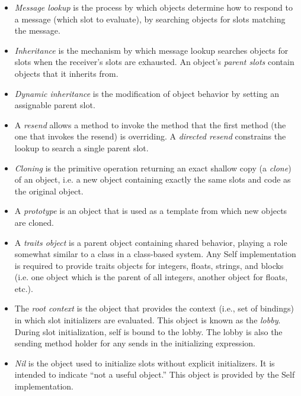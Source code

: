 \documentclass[letterpaper,10pt,english]{sphinxmanual}
\begin{document}
\begin{itemize}
\item {} 
\emph{Message lookup} is the process by which objects determine how to respond to a message (which slot to evaluate), by searching objects for slots matching the message.

\item {} 
\emph{Inheritance} is the mechanism by which message lookup searches objects for slots when the receiver’s slots are exhausted. An object’s \emph{parent slots} contain objects that it inherits from.

\item {} 
\emph{Dynamic inheritance} is the modification of object behavior by setting an assignable parent slot.

\item {} 
A \emph{resend} allows a method to invoke the method that the first method (the one that invokes the resend) is overriding. A \emph{directed resend} constrains the lookup to search a single parent slot.

\item {} 
\emph{Cloning} is the primitive operation returning an exact shallow copy (a \emph{clone}) of an object, i.e. a new object containing exactly the same slots and code as the original object.

\item {} 
A \emph{prototype} is an object that is used as a template from which new objects are cloned.

\item {} 
A \emph{traits object} is a parent object containing shared behavior, playing a role somewhat similar to a class in a class-based system. Any Self implementation is required to provide traits objects for integers, floats, strings, and blocks (i.e. one object which is the parent of all integers, another object for floats, etc.).

\item {} 
The \emph{root context} is the object that provides the context (i.e., set of bindings) in which slot initializers are evaluated. This object is known as the \emph{lobby}. During slot initialization, self is bound to the lobby. The lobby is also the sending method holder for any sends in the initializing expression.

\item {} 
\emph{Nil} is the object used to initialize slots without explicit initializers. It is intended to indicate “not a useful object.” This object is provided by the Self implementation.

\end{itemize}
\end{document}
